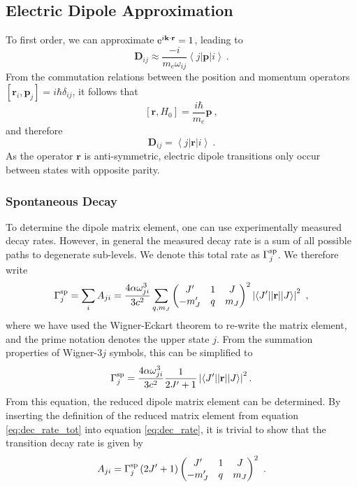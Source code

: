 \documentclass{article}
\begin{document}
\subsection{Electric Dipole Approximation}\label{sec:ED}
To first order, we can approximate ${\rm{e}}^{i\mathbf{k}\cdot\mathbf{r}} = 1$, leading to 
\begin{equation}
     \mathbf{D}_{ij} \approx \frac{-i}{m_e\omega_{ij}}\left\langle j \left| \mathbf{p} \right| i\right\rangle~.
\end{equation}  
From the commutation relations between the position and momentum operators $\left[\mathbf{r}_i, \mathbf{p}_j\right] = i\hbar \delta_{ij}$, it follows that 
\begin{equation}
    \left[\mathbf{r}, H_0\right] = \frac{i\hbar}{m_e}\mathbf{p}~,
\end{equation}
and therefore 
\begin{equation}
    \mathbf{D}_{ij} = \left\langle j \left|\mathbf{r}\right| i\right\rangle~.
\end{equation}
As the operator $\mathbf{r}$ is anti-symmetric, electric dipole transitions only occur between states with opposite parity.

\subsubsection{Spontaneous Decay}
To determine the dipole matrix element, one can use experimentally measured decay rates. However, in general the measured decay rate is a sum of all possible paths to degenerate sub-levels. We denote this total rate as $\Gamma^{\rm{sp}}_j$. We therefore write 
\begin{equation} \label{eq:dec_rate}
    \Gamma^{\rm{sp}}_j = \sum_{i} A_{ji}
    = \frac{4 \alpha \omega_{ji}^3}{3 c^2} \sum_{q, m_J} 
    \begin{pmatrix}
    J' & 1 & J\\
    -m_J' & q & m_J
    \end{pmatrix}^2 \left|\left\langle J'||\mathbf{r}||J\right\rangle\right|^2~,
\end{equation}
where we have used the Wigner-Eckart theorem to re-write the matrix element, and the prime notation denotes the upper state $j$. From the summation properties of Wigner-$3j$ symbols, this can be simplified to  
\begin{equation} \label{eq:dec_rate_tot}
    \Gamma^{\rm{sp}}_j = \frac{4\alpha\omega_{ji}^3}{3c^2} \frac{1}{2J'+1} \left|\left\langle J'||\mathbf{r}||J\right\rangle\right|^2.
\end{equation}
From this equation, the reduced dipole matrix element can be determined. By inserting the definition of the reduced matrix element from equation \ref{eq:dec_rate_tot} into equation \ref{eq:dec_rate}, it is trivial to show that the transition decay rate is given by
\begin{equation}
   A_{ji} = \Gamma^{\rm{sp}}_j \left(2J'+1\right)  \begin{pmatrix}
    J' & 1 & J\\
    -m_J' & q & m_J
    \end{pmatrix}^2~.
\end{equation}
\end{document}

